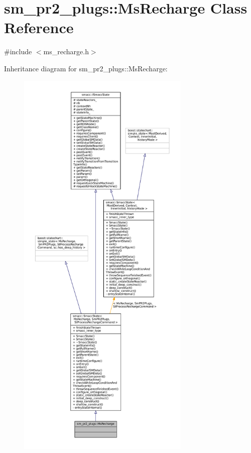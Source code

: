 \hypertarget{classsm__pr2__plugs_1_1MsRecharge}{}\section{sm\+\_\+pr2\+\_\+plugs\+:\+:Ms\+Recharge Class Reference}
\label{classsm__pr2__plugs_1_1MsRecharge}


{\ttfamily \#include $<$ms\+\_\+recharge.\+h$>$}



Inheritance diagram for sm\+\_\+pr2\+\_\+plugs\+:\+:Ms\+Recharge\+:
\nopagebreak
\begin{figure}[H]
\begin{center}
\leavevmode
\includegraphics[height=550pt]{classsm__pr2__plugs_1_1MsRecharge__inherit__graph}
\end{center}
\end{figure}


